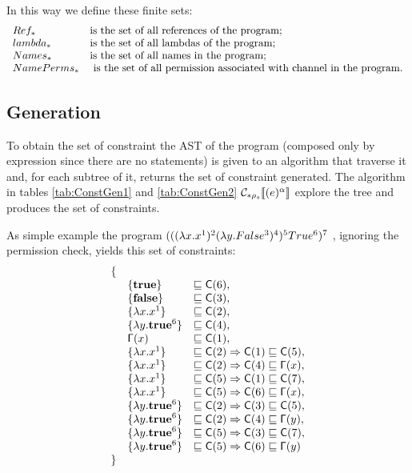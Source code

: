 In this way we define these finite sets:
\[
\begin{array}{l l}
Ref_* & $is the set of all references of the program;$\\
lambda_* & $is the set of all lambdas of the program;$\\
Names_* & $is the set of all names in the program;$\\
NamePerms_* & $ is the set of all permission associated with channel in the program.$\\
\end{array}
\]

\subsection{Generation}
To obtain the set of constraint the AST of the program (composed only by expression since there are no statements) is given to an algorithm that traverse it and, for each subtree of it, returns the set of constraint generated. The algorithm in tables \ref{tab:ConstGen1} and \ref{tab:ConstGen2} $\mathcal{C}_{*\rho_s}\llbracket (e)^\alpha \rrbracket$ explore the tree and produces the set of constraints.

As simple example the program $(((\lambda x.x^{1})^{2} (\lambda y.False^{3})^{4})^{5} True^{6})^{7}$ , ignoring the permission check, yields this set of constraints:
\[
\begin{array}{lll}
\{\\
& \{\mathbf{true}\} &\sqsubseteq \mathsf{C}(6),\\
& \{\mathbf{false}\} &\sqsubseteq \mathsf{C}(3),\\
& \{\lambda x.x^{1}\} &\sqsubseteq \mathsf{C}(2),\\
& \{\lambda y.\mathbf{true}^{6}\} &\sqsubseteq \mathsf{C}(4),\\
& \mathsf{\Gamma}(x) &\sqsubseteq \mathsf{C}(1),\\
& \{\lambda x.x^{1}\} &\sqsubseteq \mathsf{C}(2) \Rightarrow \mathsf{C}(1) \sqsubseteq \mathsf{C}(5),\\
& \{\lambda x.x^{1}\} &\sqsubseteq \mathsf{C}(2) \Rightarrow \mathsf{C}(4) \sqsubseteq \mathsf{\Gamma}(x),\\
& \{\lambda x.x^{1}\} &\sqsubseteq \mathsf{C}(5) \Rightarrow \mathsf{C}(1) \sqsubseteq \mathsf{C}(7),\\
& \{\lambda x.x^{1}\} &\sqsubseteq \mathsf{C}(5) \Rightarrow \mathsf{C}(6) \sqsubseteq \mathsf{\Gamma}(x),\\
& \{\lambda y.\mathbf{true}^{6}\} &\sqsubseteq \mathsf{C}(2) \Rightarrow \mathsf{C}(3) \sqsubseteq \mathsf{C}(5),\\
& \{\lambda y.\mathbf{true}^{6}\} &\sqsubseteq \mathsf{C}(2) \Rightarrow \mathsf{C}(4) \sqsubseteq \mathsf{\Gamma}(y),\\
& \{\lambda y.\mathbf{true}^{6}\} &\sqsubseteq \mathsf{C}(5) \Rightarrow \mathsf{C}(3) \sqsubseteq \mathsf{C}(7),\\
& \{\lambda y.\mathbf{true}^{6}\} &\sqsubseteq \mathsf{C}(5) \Rightarrow \mathsf{C}(6) \sqsubseteq \mathsf{\Gamma}(y)\\
\}
\end{array}
\]

